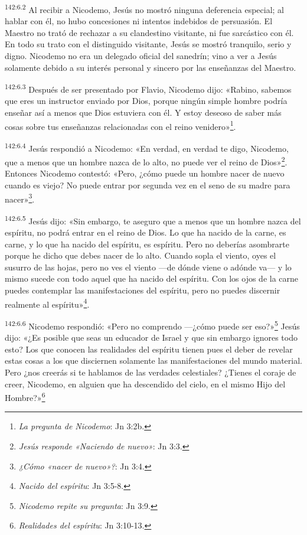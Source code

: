 \par 
\textsuperscript{142:6.2} Al recibir a Nicodemo, Jesús no mostró ninguna deferencia especial; al hablar con él, no hubo concesiones ni intentos indebidos de persuasión. El Maestro no trató de rechazar a su clandestino visitante, ni fue sarcástico con él. En todo su trato con el distinguido visitante, Jesús se mostró tranquilo, serio y digno. Nicodemo no era un delegado oficial del sanedrín; vino a ver a Jesús solamente debido a su interés personal y sincero por las enseñanzas del Maestro.

\par 
\textsuperscript{142:6.3} Después de ser presentado por Flavio, Nicodemo dijo: «Rabino, sabemos que eres un instructor enviado por Dios, porque ningún simple hombre podría enseñar así a menos que Dios estuviera con él. Y estoy deseoso de saber más cosas sobre tus enseñanzas relacionadas con el reino venidero»\footnote{\textit{La pregunta de Nicodemo}: Jn 3:2b.}.

\par 
\textsuperscript{142:6.4} Jesús respondió a Nicodemo: «En verdad, en verdad te digo, Nicodemo, que a menos que un hombre nazca de lo alto, no puede ver el reino de Dios»\footnote{\textit{Jesús responde «Naciendo de nuevo»}: Jn 3:3.}. Entonces Nicodemo contestó: «Pero, ¿cómo puede un hombre nacer de nuevo cuando es viejo? No puede entrar por segunda vez en el seno de su madre para nacer»\footnote{\textit{¿Cómo «nacer de nuevo»?}: Jn 3:4.}.

\par 
\textsuperscript{142:6.5} Jesús dijo: «Sin embargo, te aseguro que a menos que un hombre nazca del espíritu, no podrá entrar en el reino de Dios. Lo que ha nacido de la carne, es carne, y lo que ha nacido del espíritu, es espíritu. Pero no deberías asombrarte porque he dicho que debes nacer de lo alto. Cuando sopla el viento, oyes el susurro de las hojas, pero no ves el viento ---de dónde viene o adónde va--- y lo mismo sucede con todo aquel que ha nacido del espíritu. Con los ojos de la carne puedes contemplar las manifestaciones del espíritu, pero no puedes discernir realmente al espíritu»\footnote{\textit{Nacido del espíritu}: Jn 3:5-8.}.

\par 
\textsuperscript{142:6.6} Nicodemo respondió: «Pero no comprendo ---¿cómo puede ser eso?»\footnote{\textit{Nicodemo repite su pregunta}: Jn 3:9.} Jesús dijo: «¿Es posible que seas un educador de Israel y que sin embargo ignores todo esto? Los que conocen las realidades del espíritu tienen pues el deber de revelar estas cosas a los que disciernen solamente las manifestaciones del mundo material. Pero ¿nos creerás si te hablamos de las verdades celestiales? ¿Tienes el coraje de creer, Nicodemo, en alguien que ha descendido del cielo, en el mismo Hijo del Hombre?»\footnote{\textit{Realidades del espíritu}: Jn 3:10-13.}

